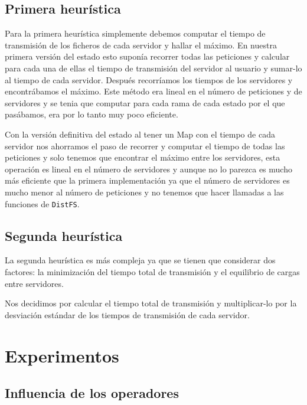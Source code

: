 \subsection{Primera heurística}

Para la primera heurística simplemente debemos computar el tiempo de transmisión de los ficheros de cada servidor y hallar
el máximo. En nuestra primera versión del estado esto suponía recorrer todas las peticiones y calcular para cada una de
ellas el tiempo de transmisión del servidor al usuario y sumar-lo al tiempo de cada servidor. Después recorríamos los tiempos
de los servidores y encontrábamos el máximo. Este método era lineal en el número de peticiones y de servidores y se tenia
que computar para cada rama de cada estado por el que pasábamos, era por lo tanto muy poco eficiente.

Con la versión definitiva del estado al tener un Map con el tiempo de cada servidor nos ahorramos el paso de
recorrer y computar el tiempo de todas las peticiones y solo tenemos que encontrar el máximo entre los servidores, 
esta operación es lineal en el número de servidores y aunque no lo parezca es mucho más eficiente que la primera
implementación ya que el número de servidores es mucho menor al número de peticiones y no tenemos que hacer
llamadas a las funciones de \texttt{DistFS}.

\subsection{Segunda heurística}

La segunda heurística es más compleja ya que se tienen que considerar dos factores: la minimización del tiempo total
de transmisión y el equilibrio de cargas entre servidores.

Nos decidimos por calcular el tiempo total de transmisión y multiplicar-lo por la desviación estándar de los tiempos
de transmisión de cada servidor.

\section{Experimentos}

\subsection{Influencia de los operadores}

